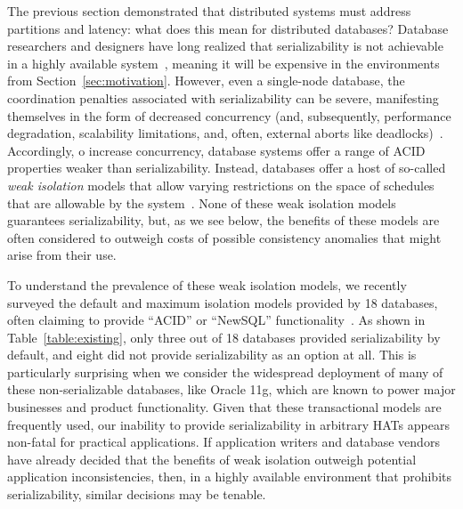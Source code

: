 The previous section demonstrated that distributed systems must
address partitions and latency: what does this mean for distributed
databases? Database researchers and designers have long realized that
serializability is not achievable in a highly available
system~\cite{davidson-survey}, meaning it will be expensive in the
environments from Section~\ref{sec:motivation}. However, even a
single-node database, the coordination penalties associated with
serializability can be severe, manifesting themselves in the form of
decreased concurrency (and, subsequently, performance degradation,
scalability limitations, and, often, external aborts like
deadlocks)~\cite{gray-isolation}. Accordingly, o increase concurrency,
database systems offer a range of ACID properties weaker than
serializability.  Instead, databases offer a host of so-called
\textit{weak isolation} models that allow varying restrictions on the
space of schedules that are allowable by the system~\cite{adya,
  ansicritique, ansi-sql}. None of these weak isolation models
guarantees serializability, but, as we see below, the benefits of
these models are often considered to outweigh costs of possible
consistency anomalies that might arise from their use.

To understand the prevalence of these weak isolation models, we
recently surveyed the default and maximum isolation models provided by
18 databases, often claiming to provide ``ACID'' or ``NewSQL''
functionality~\cite{hat-hotos}. As shown in
Table~\ref{table:existing}, only three out of 18 databases provided
serializability by default, and eight did not provide serializability
as an option at all. This is particularly surprising when we consider
the widespread deployment of many of these non-serializable databases,
like Oracle 11g, which are known to power major businesses and product
functionality. Given that these transactional models are frequently
used, our inability to provide serializability in arbitrary HATs
appears non-fatal for practical applications. If application writers
and database vendors have already decided that the benefits of weak
isolation outweigh potential application inconsistencies, then, in a
highly available environment that prohibits serializability, similar
decisions may be tenable.

